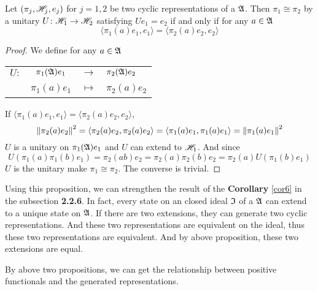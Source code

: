 \documentclass[a4paper,11pt]{report}
\begin{document}
\begin{prop}
	Let $(\pi_j,\mathscr{H}_j,e_j)$ for $j=1,2$ be two cyclic representations of a \Cs $\mathfrak{A}$. Then $\pi_1 \cong \pi_2$ by a unitary $U \colon \mathscr{H}_1 \rightarrow \mathscr{H}_2$ satisfying $Ue_1=e_2$ if and only if for any $a \in \mathfrak{A}$
	\begin{equation*}
		\langle \pi_1(a)e_1, e_1 \rangle = \langle \pi_2(a)e_2, e_2 \rangle
	\end{equation*}
\end{prop}
\begin{proof}
	We define for any $a \in \mathfrak{A}$
	\begin{center}
		\begin{tabular}{l c c l}
			$U \colon$ & $\pi_1(\mathfrak{A})e_1$ & $\longrightarrow$ & $\pi_2(\mathfrak{A})e_2$ \\
			~ & $\pi_1(a)e_1$ & $\longmapsto$ & $\pi_2(a)e_2$
		\end{tabular}
	\end{center}
	If $\langle \pi_1(a)e_1, e_1 \rangle = \langle \pi_2(a)e_2, e_2 \rangle$, 
	\begin{equation*}
		\left\lVert\pi_2(a)e_2\right\lVert^2 = \langle \pi_2(a)e_2, \pi_2(a)e_2 \rangle = \langle \pi_1(a)e_1, \pi_1(a)e_1 \rangle = \left\lVert\pi_1(a)e_1\right\lVert^2
	\end{equation*}
	$U$ is a unitary on $\pi_1(\mathfrak{A})e_1$ and $U$ can extend to $\mathscr{H}_1$. And since
	\begin{equation*}
		U(\pi_1(a)\pi_1(b)e_1) = \pi_2(ab)e_2 = \pi_2(a)\pi_2(b)e_2=\pi_2(a)U(\pi_1(b)e_1)
	\end{equation*}
	$U$ is the unitary make $\pi_1 \cong \pi_2$. The converse is trivial.
\end{proof}
\begin{rem}
	Using this proposition, we can strengthen the result of the \textbf{Corollary} \ref{cor6} in the subsection \textbf{2.2.6}. In fact, every state on an closed ideal $\mathfrak{I}$ of a \Cs $\mathfrak{A}$ can extend to a unique state on $\mathfrak{A}$. 
	If there are two extensions, they can generate two cyclic representations. And these two representations are equivalent on the ideal, thus these two representations are equivalent. And by above proposition, these two extensions are equal.
\end{rem}

By above two propositions, we can get the relationship between positive functionals and the generated representations.
\end{document}
